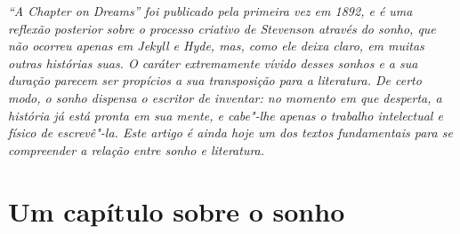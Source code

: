 

\thispagestyle{empty}
\mbox{}\vfill
{\noindent\itshape “A Chapter on Dreams” foi publicado pela primeira vez em 1892, 
e é uma reflexão posterior sobre o processo criativo de Stevenson através 
do sonho, que não ocorreu apenas em \emph{Jekyll e Hyde}, mas, como ele deixa 
claro, em muitas outras histórias suas.  O caráter extremamente vívido desses 
sonhos e a sua duração parecem ser propícios a sua transposição para a literatura.  
De certo modo, o sonho dispensa o escritor de inventar: no momento em que desperta, 
a história já está pronta em sua mente, e cabe"-lhe apenas o trabalho intelectual e físico de escrevê"-la.   
Este artigo é ainda hoje um dos textos fundamentais para se compreender a 
relação entre sonho e literatura.}

\chapter[Um capítulo sobre o sonho\\ \textit{R.L.~Stevenson}]{Um capítulo sobre o sonho}

